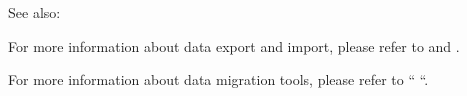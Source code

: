 \documentclass[letterpaper,10pt,english]{sphinxmanual}
\begin{document}
\begin{sphinxseealso}{See also:}

\sphinxAtStartPar
For more information about data export and import, please refer to  and .

\sphinxAtStartPar
For more information about data migration tools, please refer to “  “.


\end{sphinxseealso}




\renewcommand{\indexname}{Index}
\printindex
\end{document}

